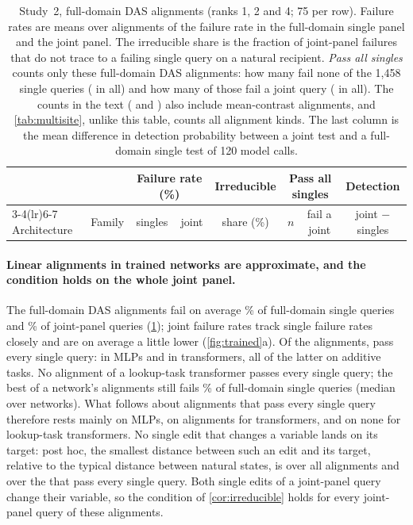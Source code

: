 \begin{table}[t]
\centering
\small
\setlength{\tabcolsep}{4.5pt}
\begin{tabular}{@{}l l c c c c c c@{}}
\toprule
& & \multicolumn{2}{c}{Failure rate (\%)} & Irreducible & \multicolumn{2}{c}{Pass all singles} & Detection \\
\cmidrule(lr){3-4}\cmidrule(lr){6-7}
Architecture & Family & singles & joint & share (\%) & $n$ & fail a joint & joint $-$ singles \\
\midrule

\end{tabular}
\caption{Study~2, full-domain DAS alignments (ranks 1, 2 and 4; 75 per row). Failure rates are means over
alignments of the failure rate in the full-domain single panel and the joint panel. The irreducible share is the
fraction of joint-panel failures that do not trace to a failing single query on a natural recipient. \emph{Pass
all singles} counts only these full-domain DAS alignments: how many fail none of the 1,458 single queries
(\TrnPerfectDas{} in all) and how many of those fail a joint query (\TrnJointOnlyDasCount{} in all). The
counts in the text (\TrnPerfect{} and \TrnPerfectJointFailWord) also include mean-contrast alignments, and
\cref{tab:multisite}, unlike this table, counts all alignment kinds. The last column is the mean difference in
detection probability between a joint test and a full-domain single test of 120 model calls.}
\label{tab:trained}
\end{table}

\paragraph{Linear alignments in trained networks are approximate, and the condition holds on the whole joint panel.}
The full-domain DAS alignments fail on average \TrnSingleRate\% of full-domain single queries and \TrnJointRate\% of
joint-panel queries (\cref{tab:trained}); joint failure rates track single failure rates closely and are on average
a little lower (\cref{fig:trained}a). Of the \TrnCandidates{} alignments, \TrnPerfect{} pass every single query:
\TrnPerfectMlp{} in MLPs and \TrnPerfectTransformer{} in transformers, all of the latter on additive tasks. No
alignment of a lookup-task transformer passes every single query; the best of a network's alignments still fails
\TrnLookupTransformerBest\% of full-domain single queries (median over networks). What follows about alignments that
pass every single query therefore rests mainly on MLPs, on \TrnPerfectTransformer{} alignments for transformers, and
on none for lookup-task transformers. No single edit that changes a variable lands on its target: post hoc, the smallest distance between such
an edit and its target, relative to the typical distance between natural states, is \TrnLandMinAll{} over all
alignments and \TrnLandMinPerfect{} over the \TrnPerfect{} that pass every single query. Both single edits of a
joint-panel query change their variable, so the condition of \cref{cor:irreducible} holds for every joint-panel
query of these \TrnPerfect{} alignments.

